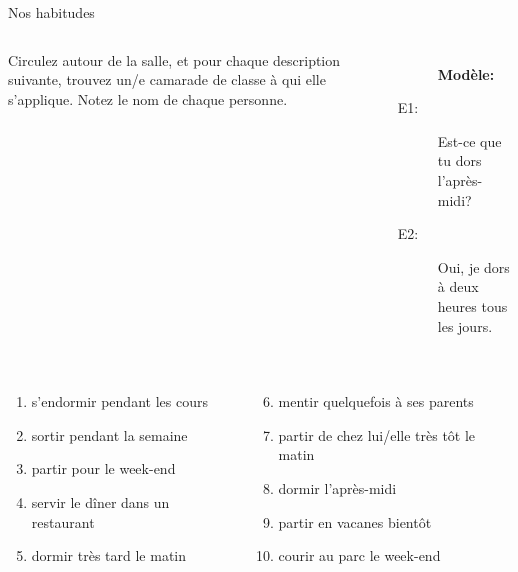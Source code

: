 \begin{frame}{Nos habitudes}
  \begin{columns}
      Circulez autour de la salle, et pour chaque description suivante, trouvez un/e camarade de classe à qui elle s'applique.
      Notez le nom de chaque personne. \\
      \begin{description}
        \item[] \textbf{Modèle:}
        \item[E1:] Est-ce que tu dors l'après-midi?
        \item[] 
        \item[E2:] Oui, je dors à deux heures tous les jours.
        \item[] 
      \end{description}
  \end{columns}
  \vspace{0.5cm}
  \begin{columns}[t]
    \scriptsize
      \begin{enumerate}
        \item s'endormir pendant les cours
        \item sortir pendant la semaine
        \item partir pour le week-end
        \item servir le dîner dans un restaurant
        \item dormir très tard le matin
      \end{enumerate}
      \begin{enumerate}
        \setcounter{enumi}{5}
        \item mentir quelquefois à ses parents
        \item partir de chez lui/elle très tôt le matin
        \item dormir l'après-midi
        \item partir en vacanes bientôt
        \item courir au parc le week-end
      \end{enumerate}
  \end{columns}
\end{frame}